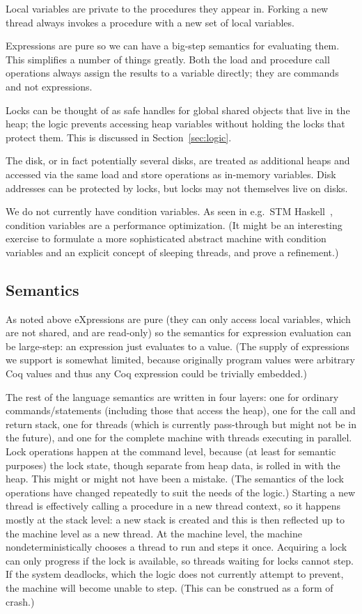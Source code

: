 Local variables are private to the procedures they appear in.
Forking a new thread always invokes a procedure with a new set of
local variables.

Expressions are pure so we can have a big-step semantics for
evaluating them.
This simplifies a number of things greatly.
Both the load and procedure call operations always assign the results
to a variable directly; they are commands and not expressions.

Locks can be thought of as safe handles for global shared objects that
live in the heap; the logic prevents accessing heap variables without
holding the locks that protect them.
This is discussed in Section~\ref{sec:logic}.

The disk, or in fact potentially several disks, are treated as
additional heaps and accessed via the same load and store operations
as in-memory variables.
Disk addresses can be protected by locks, but locks may not themselves
live on disks.

We do not currently have condition variables.
As seen in e.g.\ STM Haskell~\cite{stmhaskell}, condition variables are
a performance optimization.
(It might be an interesting exercise to formulate a more sophisticated
abstract machine with condition variables and an explicit concept of
sleeping threads, and prove a refinement.)

%
\subsection{Semantics}

As noted above eXpressions are pure (they can only access local
variables, which are not shared, and are read-only) so the
semantics for expression evaluation can be large-step: an expression
just evaluates to a value.
(The supply of expressions we support is somewhat limited, because
originally program values were arbitrary Coq values and thus any Coq
expression could be trivially embedded.)

The rest of the language semantics are written in four layers: one for
ordinary commands/statements (including those that access the heap),
one for the call and return stack, one for threads (which is currently
pass-through but might not be in the future), and one for the complete
machine with threads executing in parallel.
Lock operations happen at the command level, because (at least for
semantic purposes) the lock state, though separate from heap data, is
rolled in with the heap.
This might or might not have been a mistake.
(The semantics of the lock operations have changed repeatedly to suit
the needs of the logic.)
Starting a new thread is effectively calling a procedure in a new
thread context, so it happens mostly at the stack level: a new stack
is created and this is then reflected up to the machine level as a new
thread.
At the machine level, the machine nondeterministically chooses a
thread to run and steps it once.
Acquiring a lock can only progress if the lock is available, so
threads waiting for locks cannot step.
If the system deadlocks, which the logic does not currently attempt to
prevent, the machine will become unable to step.
(This can be construed as a form of crash.)

